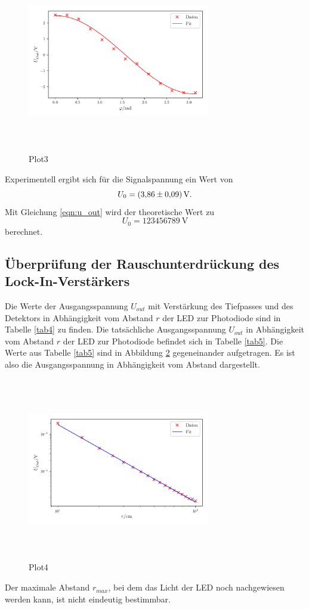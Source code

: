 \begin{figure}
    \centering
    \includegraphics[width=8cm, height=8cm]{build/plot3.pdf}
    \caption{Plot3}
    \label{fig:plot3}
\end{figure}

\noindent Experimentell ergibt sich für die Signalspannung ein Wert von
\begin{equation*}
    U_{0} = \SI{3.86 \pm 0.09}{\volt}.
\end{equation*}
Mit Gleichung \eqref{eqn:u_out} wird der theoretische Wert zu
\begin{equation*}
    U_{0} = \SI{123456789}{\volt} %
\end{equation*}
berechnet.

\subsection{Überprüfung der Rauschunterdrückung des Lock-In-Verstärkers}
Die Werte der Ausgangsspannung $U_{out}$ mit Verstärkung des Tiefpasses und des Detektors in Abhängigkeit vom Abstand $r$ der LED
zur Photodiode sind in Tabelle \ref{tab4} zu finden.
Die tatsächliche Ausgangsspannung $U_{out}$ in Abhängigkeit vom Abstand $r$ der LED
zur Photodiode befindet sich in Tabelle \ref{tab5}.
Die Werte aus Tabelle \ref{tab5} sind in Abbildung \ref{fig:plot4}
gegeneinander aufgetragen. Es ist also die Ausgangsspannung in Abhängigkeit
vom Abstand dargestellt.



\begin{figure}
    \centering
    \includegraphics[width=8cm, height=8cm]{build/plot4.pdf}
    \caption{Plot4}
    \label{fig:plot4}
\end{figure}

\noindent Der maximale Abstand $r_{max}$, bei dem das Licht der LED %
noch nachgewiesen werden kann, ist nicht eindeutig bestimmbar. 